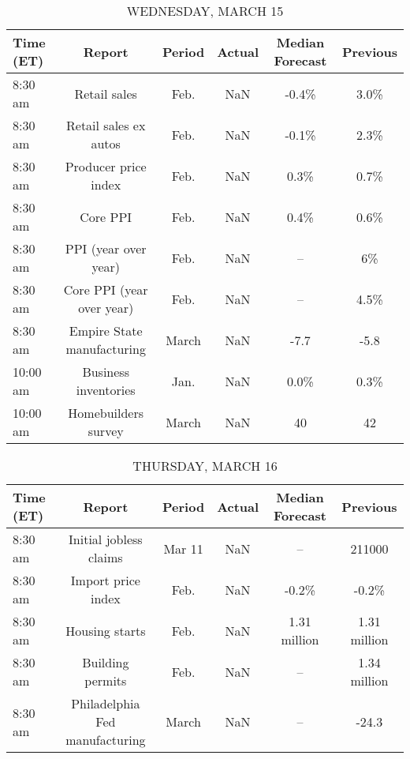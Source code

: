 \documentclass{article}%
\begin{document}
\begin{table}[htbp]%
\caption{WEDNESDAY, MARCH 15}%
\centering%
\begin{adjustbox}{width=1\textwidth}%
\begin{tabular}{lccccc}
\toprule
Time (ET) &                     Report & Period & Actual & Median Forecast & Previous \\
\midrule
  8:30 am &               Retail sales &   Feb. &    NaN &           -0.4\% &     3.0\% \\
  8:30 am &      Retail sales ex autos &   Feb. &    NaN &           -0.1\% &     2.3\% \\
  8:30 am &       Producer price index &   Feb. &    NaN &            0.3\% &     0.7\% \\
  8:30 am &                   Core PPI &   Feb. &    NaN &            0.4\% &     0.6\% \\
  8:30 am &       PPI (year over year) &   Feb. &    NaN &              -- &       6\% \\
  8:30 am &  Core PPI (year over year) &   Feb. &    NaN &              -- &     4.5\% \\
  8:30 am & Empire State manufacturing &  March &    NaN &            -7.7 &     -5.8 \\
 10:00 am &       Business inventories &   Jan. &    NaN &            0.0\% &     0.3\% \\
 10:00 am &        Homebuilders survey &  March &    NaN &              40 &       42 \\
\bottomrule
\end{tabular}
%
\end{adjustbox}%
\end{table}

%


\begin{table}[htbp]%
\caption{THURSDAY, MARCH 16}%
\centering%
\begin{adjustbox}{width=1\textwidth}%
\begin{tabular}{lccccc}
\toprule
Time (ET) &                         Report & Period & Actual & Median Forecast &     Previous \\
\midrule
  8:30 am &         Initial jobless claims & Mar 11 &    NaN &              -- &       211000 \\
  8:30 am &             Import price index &   Feb. &    NaN &           -0.2\% &        -0.2\% \\
  8:30 am &                 Housing starts &   Feb. &    NaN &    1.31 million & 1.31 million \\
  8:30 am &               Building permits &   Feb. &    NaN &              -- & 1.34 million \\
  8:30 am & Philadelphia Fed manufacturing &  March &    NaN &              -- &        -24.3 \\
\bottomrule
\end{tabular}
%
\end{adjustbox}%
\end{table}
\end{document}
